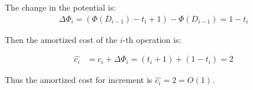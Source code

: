 \documentclass[11pt]{article}
\theoremstyle{definition}
\begin{document}
The change in the potential is:
\begin{eqnarray*}
\Delta \Phi_i = (\Phi(D_{i-1}) - t_i+1) - \Phi(D_{i-1}) = 1-t_i 
\end{eqnarray*}

Then the amortized cost of the $i$-th operation is:

\begin{eqnarray*}
\hat{c_i} &= c_i+\Delta\Phi_i = (t_i+1) + (1-t_i) = 2
\end{eqnarray*}

Thus the amortized cost for increment is $\hat{c_i} = 2 = O(1)$.
\end{document}
